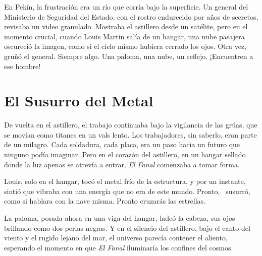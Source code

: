 En Pekín, la frustración era un río que corría bajo la superficie. Un general del Ministerio de Seguridad del Estado, con el rostro endurecido por años de secretos, revisaba un video granulado. Mostraba el astillero desde un satélite, pero en el momento crucial, cuando Louis Martin salía de un hangar, una nube pasajera oscureció la imagen, como si el cielo mismo hubiera cerrado los ojos. \glqq Otra vez,\grqq~ gruñó el general. \glqq Siempre algo. Una paloma, una nube, un reflejo. ¡Encuentren a ese hombre!\grqq

\section{El Susurro del Metal}

De vuelta en el astillero, el trabajo continuaba bajo la vigilancia de las grúas, que se movían como titanes en un vals lento. Los trabajadores, sin saberlo, eran parte de un milagro. Cada soldadura, cada placa, era un paso hacia un futuro que ninguno podía imaginar. Pero en el corazón del astillero, en un hangar sellado donde la luz apenas se atrevía a entrar, \emph{El Fanal} comenzaba a tomar forma.

Louis, solo en el hangar, tocó el metal frío de la estructura, y por un instante, sintió que vibraba con una energía que no era de este mundo. \glqq Pronto,\grqq~ susurró, como si hablara con la nave misma. \glqq Pronto cruzarás las estrellas.\grqq

La paloma, posada ahora en una viga del hangar, ladeó la cabeza, sus ojos brillando como dos perlas negras. Y en el silencio del astillero, bajo el canto del viento y el rugido lejano del mar, el universo parecía contener el aliento, esperando el momento en que \emph{El Fanal} iluminaría los confines del cosmos.
